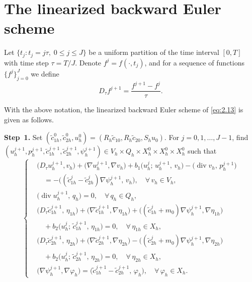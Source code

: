 \documentclass[a4paper,fleqn]{cas-sc}
\numberwithin{equation}{section}
\theoremstyle{definition}
\begin{document}
\section{The linearized backward Euler scheme}
\label{sec:scheme}

Let $\{t_{j}: t_{j}=j\tau,\;0\le j\le J\}$ be a uniform partition of the
time interval $[0,T]$ with time step $\tau=T/J$. Denote
$f^{j}=f(\cdot,t_{j})$, and for a sequence of functions $\{f^{j}\}_{j=0}^{J}$
we define
\begin{equation}
  D_{\tau}f^{j+1} = \frac{f^{j+1}-f^{j}}{\tau}.
  \label{eq:3.1}
\end{equation}

With the above notation, the linearized backward Euler scheme of
\eqref{eq:2.13} is given as follows.

\medskip
\noindent\textbf{Step~1.}
Set $(\tilde{c}^{0}_{1h},\tilde{c}^{0}_{2h},u^{0}_{h})
=(R_{h}\tilde{c}_{10},R_{h}\tilde{c}_{20},S_{h}u_{0})$.
For $j=0,1,\ldots,J-1$, find
$(u^{j+1}_{h},p^{j+1}_{h},\tilde{c}^{j+1}_{1h},
 \tilde{c}^{j+1}_{2h},\psi^{j+1}_{h})
\in V_{h}\times Q_{h}\times X^{0}_{h}\times X^{0}_{h}\times X^{0}_{h}$
such that
\begin{equation}
  \left\{
  \begin{aligned}
    &\bigl(D_{\tau}u^{j+1}_{h},v_{h}\bigr)
     + \bigl(\nabla u^{j+1}_{h},\nabla v_{h}\bigr)
     + b_{1}\bigl(u^{j}_{h};\,u^{j+1}_{h},\,v_{h}\bigr)
     - \bigl(\operatorname{div}v_{h},\,p^{j+1}_{h}\bigr)\\
    &\quad
     = -\bigl((\tilde{c}^{j}_{1h}-\tilde{c}^{j}_{2h})\nabla\psi^{j+1}_{h},\,v_{h}\bigr),
     \quad \forall\,v_{h}\in V_{h},\\[4pt]
    &\bigl(\operatorname{div}u^{j+1}_{h},\,q_{h}\bigr) = 0,
     \quad \forall\,q_{h}\in Q_{h},\\[4pt]
    &\bigl(D_{\tau}\tilde{c}^{j+1}_{1h},\,\eta_{1h}\bigr)
     + \bigl(\nabla\tilde{c}^{j+1}_{1h},\nabla\eta_{1h}\bigr)
     + \bigl((\tilde{c}^{j}_{1h}+m_{0})\nabla\psi^{j+1}_{h},\nabla\eta_{1h}\bigr)\\
    &\quad
     + b_{2}\bigl(u^{j}_{h};\,\tilde{c}^{j+1}_{1h},\,\eta_{1h}\bigr)
     = 0,
     \quad \forall\,\eta_{1h}\in X_{h},\\[4pt]
    &\bigl(D_{\tau}\tilde{c}^{j+1}_{2h},\,\eta_{2h}\bigr)
     + \bigl(\nabla\tilde{c}^{j+1}_{2h},\nabla\eta_{2h}\bigr)
     - \bigl((\tilde{c}^{j}_{2h}+m_{0})\nabla\psi^{j+1}_{h},\nabla\eta_{2h}\bigr)\\
    &\quad
     + b_{2}\bigl(u^{j}_{h};\,\tilde{c}^{j+1}_{2h},\,\eta_{2h}\bigr)
     = 0,
     \quad \forall\,\eta_{2h}\in X_{h},\\[4pt]
    &\bigl(\nabla\psi^{j+1}_{h},\nabla\varphi_{h}\bigr)
     = \bigl(\tilde{c}^{j+1}_{1h}-\tilde{c}^{j+1}_{2h},\,\varphi_{h}\bigr),
     \quad \forall\,\varphi_{h}\in X_{h}.
  \end{aligned}
  \right.
  \label{eq:3.2}
\end{equation}
\end{document}

